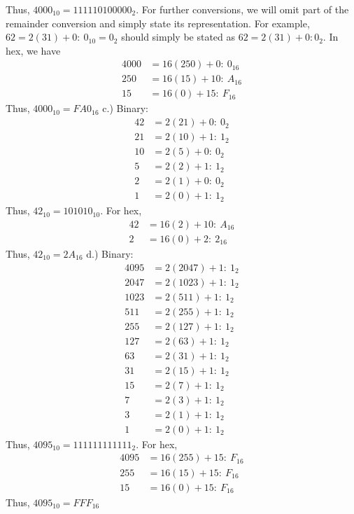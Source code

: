 \documentclass{report}
\begin{document}
    Thus, $4000_{10} = 111110100000_{2}$. For further conversions, we will omit part of the remainder conversion and simply state its representation. For example, $62 = 2(31) + 0:\ 0_{10} = 0_{2}$ should simply be stated as $62 = 2(31) + 0: 0_{2}$.
    \bigbreak \noindent 
    In hex, we have
    \begin{align*}
        4000 &= 16(250) + 0:\ 0_{16} \\
        250 &= 16(15) + 10:\ A_{16} \\
        15 &= 16(0) + 15:\ F_{16}
    \end{align*}
    Thus, $4000_{10} = FA0_{16} $
    \bigbreak \noindent 
    c.)  Binary:
    \begin{align*}
        42 &= 2(21) + 0:\ 0_{2}  \\
        21 &= 2(10) +1:\ 1_{2} \\
        10 &= 2(5) +0 :\ 0_{2} \\
        5 &= 2(2) + 1:\ 1_{2} \\
        2 &= 2(1) + 0:\ 0_{2} \\
        1 &= 2(0) + 1:\ 1_{2}
    \end{align*}
    Thus, $42_{10} =101010_{10} $. For hex,
    \begin{align*}
        42 &= 16(2) + 10:\ A_{16} \\
        2 &= 16(0) + 2:\ 2_{16}
    \end{align*}
    Thus, $42_{10} = 2A_{16} $
    \bigbreak \noindent 
    d.) Binary:
    \begin{align*}
        4095 &= 2(2047) + 1:\ 1_{2} \\
        2047 &= 2(1023) + 1:\ 1_{2} \\
        1023 &= 2(511) + 1:\ 1_{2} \\
        511 &= 2(255) + 1:\ 1_{2} \\
        255 &= 2(127) + 1:\ 1_{2} \\
        127 &= 2(63) +1:\ 1_{2} \\
        63 &= 2(31) + 1:\ 1_{2} \\
        31 &= 2(15) + 1:\ 1_{2} \\
        15 &= 2(7) + 1:\ 1_{2} \\
        7 &= 2(3) + 1:\ 1_{2} \\
        3 &=2(1) + 1:\ 1_{2} \\
        1 &= 2(0) +1:\ 1_{2}
    \end{align*}
    Thus, $4095_{10} = 111111111111_{2} $. For hex,
    \begin{align*}
        4095 &= 16(255) + 15:\ F_{16} \\
        255 &= 16(15) + 15:\ F_{16} \\
        15 &= 16(0) + 15:\ F_{16}
    \end{align*}
    Thus, $4095_{10} =FFF_{16} $
\end{document}
